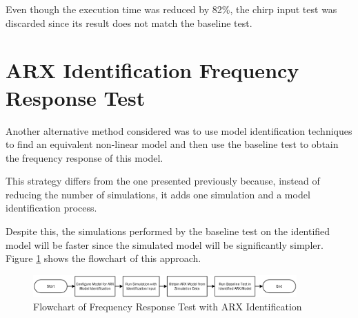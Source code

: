 \begin{table}[H]
	\label{table:A_ChirpScripResults}
	\centering
\end{table}

Even though the execution time was reduced by 82\%, the chirp input test was discarded since its result does not match the baseline test.

\section{ARX Identification Frequency Response Test}

Another alternative method considered was to use model identification techniques to find an equivalent non-linear model and then use the baseline test to obtain the frequency response of this model. 

This strategy differs from the one presented previously because, instead of reducing the number of simulations, it adds one simulation and a model identification process. 

Despite this, the simulations performed by the baseline test on the identified model will be faster since the simulated model will be significantly simpler. Figure \ref{fig:a4_3_2_2_ARXFrequencyResponseFlowchart} shows the flowchart of this approach.

\begin{figure}[H]
	\centering
	\centerline{\includegraphics[width=0.9\textwidth]{Figuras/A.FrequencyResponseTest/A-ARXFrequencyResponse.jpg}}
	\caption{Flowchart of Frequency Response Test with ARX Identification}
	\label{fig:a4_3_2_2_ARXFrequencyResponseFlowchart}
\end{figure}

